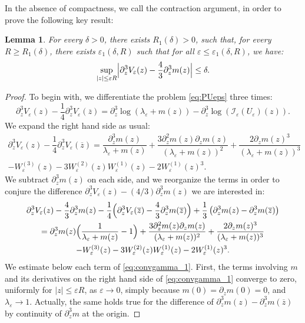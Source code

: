 \documentclass[10pt]{amsart}
\let\mathcal\mathscr
\newcommand{\cI}{\mathcal{I}}
\theoremstyle{plain}
\newtheorem{lem}[thm]{Lemma}
\theoremstyle{definition}
\let\eps\varepsilon
\newcommand{\abs}[1]{\left\lvert#1\right\rvert}
\newcommand{\Babs}[1]{\Bigl\lvert#1\Bigr\rvert}
\newcommand{\bz}{\overline{z}}
\begin{document}
In the absence of compactness, we call the contraction argument, in order to prove the following key result:

\begin{lem}\label{lem:last contraction}
For every $\delta\!>\!0$, there exists $R_1(\delta)\!>\!0$, such that, for every \hbox{$R\!\geq\!R_1(\delta)$}, there exists $\eps_1(\delta,R)$ such that for all $\eps \leq \eps_1(\delta,R)$, we have:
\begin{equation}\label{eq:convgamma_obj}
\sup_{ \abs{z} \leq \eps R} \Babs{ \partial_z^3 V_\eps(z) - \frac43 \partial_z^3 m(z) } \leq \delta.
\end{equation}
\end{lem}

\begin{proof}
To begin with, we differentiate the problem \eqref{eq:PUeps} three times:
\begin{equation*}
\partial_z^3 V_\eps(z) - \dfrac{1}{4}\partial_z^3 V_\eps(\bz) = \partial_z^3 \log\left (\lambda_\eps + m(z)\right) - \partial_z^3 \log\left (\cI_\eps(U_\eps)(z) \right).
\end{equation*}
We expand the right hand side as usual:
\begin{multline*}
\partial_z^3 V_\eps(z) - \dfrac{1}{4} \partial_z^3 V_\eps(\bz) = \dfrac{\partial^3_z m(z)}{\lambda_\eps +m(z)}+\dfrac{3 \partial^2_z m(z)\partial_z m(z)}{(\lambda_\eps +m(z))^2}
+\dfrac{2 \partial_z m(z	)^3}{(\lambda_\eps +m(z))^3} \\ - W_\eps^{(3)}(z)- 3W_\eps^{(2)}(z)W_\eps^{(1)}(z)-2W_\eps^{(1)}(z)^3.
\end{multline*}
We subtract $\partial_z^3 m(z)$ on each side, and we reorganize the terms in order to conjure the difference $\partial_z^3 V_\eps(z) - (4/3) \partial_z^3 m(z)$ we are interested in:
\begin{multline}\label{eq:convgamma_1}
\partial_z^3 V_\eps(z) - \frac43 \partial_z^3 m(z) - \dfrac{1}{4}\Bigl(\partial_z^3 V_\eps(\bz)-\frac43 \partial_z^3 m(\bz) \Bigr) + \dfrac{1}{3} \left(\partial_z^3 m(z) - \partial_z^3 m(\bz)\right)\\
=\partial^3_z m(z) \Bigl(\dfrac{1}{\lambda_\eps +m(z)}-1 \Bigr) + \dfrac{3 \partial^2_z m(z)\partial_z m(z)}{(\lambda_\eps +m(z))^2}
+\dfrac{2 \partial_z m(z	)^3}{(\lambda_\eps +m(z))^3}\\ - W_\eps^{(3)}(z)- 3W_\eps^{(2)}(z)W_\eps^{(1)}(z)-2W_\eps^{(1)}(z)^3.
\end{multline}
We estimate below each term of \eqref{eq:convgamma_1}.
First, the terms involving $m$ and its derivatives on the right hand side of \eqref{eq:convgamma_1} converge to zero, uniformly for $|z|\leq \eps R$, as $\eps\to 0$, simply because $m(0) = \partial_z m(0)= 0$, and $\lambda_\eps\to 1$.
Actually, the same holds true for the difference of $ \partial_z^3 m(z) - \partial_z^3 m(\bz)$ by continuity of $\partial_z^3m$ at the origin.


\end{proof}
\end{document}
